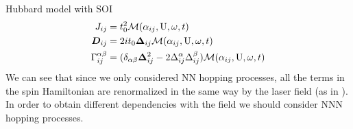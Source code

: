 \begin{section}{Hubbard model with SOI}
\begin{align}
J_{ij} &= t_0^2\mathcal{M}(\alpha_{ij}, \text{U}, \omega, t) \label{JijHSOI} \\
\boldsymbol{D}_{ij} &= 2it_0\boldsymbol{\Delta}_{ij} \mathcal{M}(\alpha_{ij}, \text{U}, \omega, t) \label{DijHSOI} \\
\Gamma_{ij}^{\alpha \beta} &= (\delta_{\alpha \beta} \boldsymbol{\Delta}_{ij}^2 - 2\Delta_{ij}^\alpha\Delta_{ij}^\beta )\mathcal{M}(\alpha_{ij}, \text{U}, \omega, t)
\end{align}
We can see that since we only considered NN hopping processes, all the terms in the spin Hamiltonian are renormalized in the same way by the laser field (as in \cite{Stepanov2017}). In order to obtain different dependencies with the field we should consider NNN hopping processes.

\end{section}